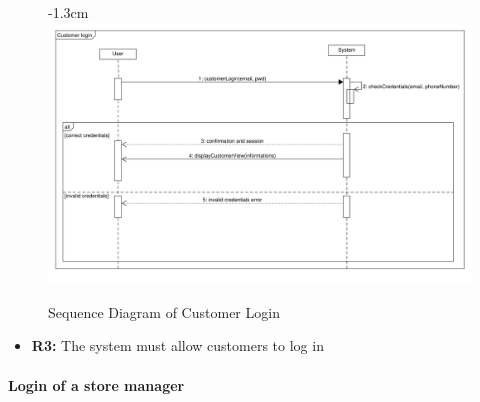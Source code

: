 \documentclass{article}
\begin{document}
\begin{center}
					\begin{figure}[!h]
						\begin{adjustwidth} {-1.3cm}{}
							\centering
							\includegraphics[scale=0.36]{SD/3_customerLogin.pdf}\\
							\caption{Sequence Diagram of Customer Login}
						\end{adjustwidth}
					\end{figure}

					\begin{itemize}
					\bigskip
					\bigskip
					\bigskip
					 {\bfseries Required functional requirements: }
					\item {\bfseries R3: } The system must allow customers to log in

					\end{itemize}

				\end{center}
			
					\bigskip
					\bigskip
					\bigskip
			\paragraph{Login of a store manager}
			
\end{document}

